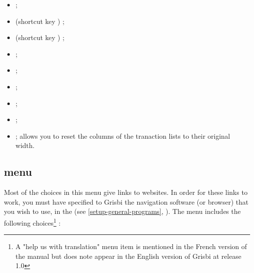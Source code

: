 \begin{itemize}
	 \item {} ; 
	 \item {} (shortcut key ) ;
	 \item {} (shortcut key ) ;
	 \item {} ;
	 \item {} ;
	 \item {} ;
	 \item {} ;
	 \item {} ;
	 \item {} ; allows you to reset the columns of the tranaction lists to their original width.
\end{itemize}


\subsection{ menu\label{home-menus-help}}

Most of the choices in this menu give links to websites. In order for these links to work, you must have specified to Grisbi the navigation software (or browser) that you wish to use, in the  (see \vref{setup-general-programs}, ). The  menu includes the following choices\footnote{ A "help us with translation" menu item is mentioned in the French version of the manual but does note appear in the English version of Grisbi at release 1.0} :

